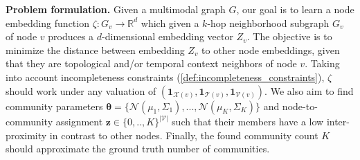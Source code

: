 \vspace{3mm}
\noindent\textbf{Problem formulation.} 
Given a multimodal graph $G$, our goal is to learn a node embedding function $\zeta: G_{v} \rightarrow \mathbb{R}^{d}$ which given a $k$-hop neighborhood subgraph $G_{v}$ of node $v$ produces a $d$-dimensional embedding vector $Z_v$.
The objective is to minimize the distance between embedding $Z_v$ to other node embeddings, given that they are topological and/or temporal context neighbors of node $v$.
Taking into account incompleteness constraints (\cref{def:incompleteness_constraints}), $\zeta$ should work under any valuation of $(\mathbf{1}_{\mathcal{X}(v)}, \mathbf{1}_{\mathcal{T}(v)}, \mathbf{1}_{\mathcal{V}(v)})$.
We also aim to find community parameters $\mathbf{\theta} = \{\mathcal{N}(\mu_1, \Sigma_1), ..., \mathcal{N}(\mu_K, \Sigma_K)\}$ and node-to-community assignment $\mathbf{z} \in \{0, .., K\}^{|\mathcal{V}|}$ such that their members have a low inter-proximity in contrast to other nodes.
Finally, the found community count $K$ should approximate the ground truth number of communities.